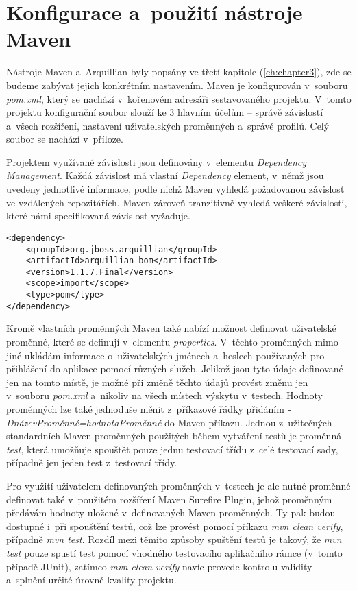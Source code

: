 \documentclass[
    color,   %
	table,   %
    twoside, %
    nolot, nolof,
]{fithesis3}
\begin{document}
\section{Konfigurace a~použití nástroje Maven}
\label{sec:5.2}
Nástroje Maven a~Arquillian byly popsány ve třetí kapitole (\ref{ch:chapter3}), zde se budeme zabývat jejich konkrétním nastavením. Maven je konfigurován v~souboru \emph{pom.xml}, který se nachází v~kořenovém adresáři sestavovaného projektu. V~tomto projektu konfigurační soubor slouží ke 3 hlavním účelům – správě závislostí a~všech rozšíření, nastavení uživatelských proměnných a~správě profilů. Celý soubor se nachází v~příloze.

Projektem využívané závislosti jsou definovány v~elementu \emph{Dependency Management}. Každá závislost má vlastní \emph{Dependency} element, v~němž jsou uvedeny jednotlivé informace, podle nichž Maven vyhledá požadovanou závislost ve vzdálených repozitářích. Maven zároveň tranzitivně vyhledá veškeré závislosti, které námi specifikovaná závislost vyžaduje.

\begin{lstlisting}
<dependency>
	<groupId>org.jboss.arquillian</groupId>
	<artifactId>arquillian-bom</artifactId>
	<version>1.1.7.Final</version>
	<scope>import</scope>
	<type>pom</type>
</dependency>
\end{lstlisting} 

Kromě vlastních proměnných Maven také nabízí možnost definovat uživatelské proměnné, které se definují v~elementu \emph{properties}. V~těchto proměnných  mimo jiné ukládám informace o~uživatelských jménech a~heslech používaných pro přihlášení do aplikace pomocí různých služeb. Jelikož jsou tyto údaje definované jen na tomto místě, je možné při změně těchto údajů provést změnu jen v~souboru \emph{pom.xml} a~nikoliv na všech místech výskytu v~testech. Hodnoty proměnných lze také jednoduše měnit z~příkazové řádky přidáním \emph{-DnázevProměnné=hodnotaProměnné} do Maven příkazu. Jednou z~užitečných standardních Maven proměnných použitých během vytváření testů je proměnná \emph{test}, která umožňuje spouštět pouze jednu testovací třídu z~celé testovací sady, případně jen jeden test z~testovací třídy.

Pro využití uživatelem definovaných proměnných v~testech je ale nutné proměnné definovat také v~použitém rozšíření Maven Surefire Plugin, jehož proměnným předávám hodnoty uložené v~definovaných Maven proměnných. Ty pak budou dostupné i~při spouštění testů, což lze provést pomocí příkazu \emph{mvn clean verify}, případně \emph{mvn test}. Rozdíl mezi těmito způsoby spuštění testů je takový, že \emph{mvn test} pouze spustí test pomocí vhodného testovacího aplikačního rámce (v~tomto případě JUnit), zatímco \emph{mvn clean verify} navíc provede kontrolu validity a~splnění určité úrovně kvality projektu.
\end{document}
